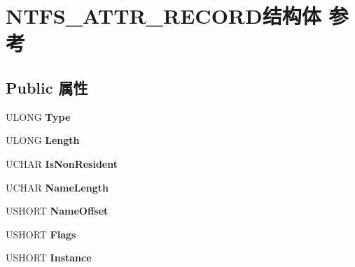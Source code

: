 \hypertarget{struct_n_t_f_s___a_t_t_r___r_e_c_o_r_d}{}\section{N\+T\+F\+S\+\_\+\+A\+T\+T\+R\+\_\+\+R\+E\+C\+O\+R\+D结构体 参考}
\label{struct_n_t_f_s___a_t_t_r___r_e_c_o_r_d}
\subsection*{Public 属性}
\begin{DoxyCompactItemize}
\item 
\mbox{\label{struct_n_t_f_s___a_t_t_r___r_e_c_o_r_d_aebe7bc601be0885c6e0ce38ef094b365}} 
U\+L\+O\+NG {\bfseries Type}
\item 
\mbox{\label{struct_n_t_f_s___a_t_t_r___r_e_c_o_r_d_a333da8607ce5ae4736d1c29048b5bd77}} 
U\+L\+O\+NG {\bfseries Length}
\item 
\mbox{\label{struct_n_t_f_s___a_t_t_r___r_e_c_o_r_d_ac29221761c6e8917350b0f767a932b9a}} 
U\+C\+H\+AR {\bfseries Is\+Non\+Resident}
\item 
\mbox{\label{struct_n_t_f_s___a_t_t_r___r_e_c_o_r_d_aa988d98fb5375c74e824e24ad3f995fe}} 
U\+C\+H\+AR {\bfseries Name\+Length}
\item 
\mbox{\label{struct_n_t_f_s___a_t_t_r___r_e_c_o_r_d_a453b7134a32863d34a8690dcdafef060}} 
U\+S\+H\+O\+RT {\bfseries Name\+Offset}
\item 
\mbox{\label{struct_n_t_f_s___a_t_t_r___r_e_c_o_r_d_a0df642a0a1154063ee8f4b264d8d2414}} 
U\+S\+H\+O\+RT {\bfseries Flags}
\item 
\mbox{\label{struct_n_t_f_s___a_t_t_r___r_e_c_o_r_d_a537a245ef6f60554fe1d14bd8d350a59}} 
U\+S\+H\+O\+RT {\bfseries Instance}
\item 
\mbox{\label{struct_n_t_f_s___a_t_t_r___r_e_c_o_r_d_aa95dfa9a633d73ad13eece9f6b963151}} 

\end{DoxyCompactItemize}
